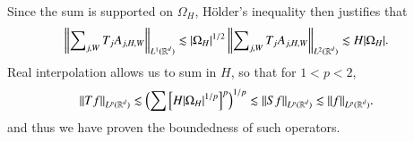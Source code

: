 %
%
%
Since the sum is supported on $\Omega_H$, H\"{o}lder's inequality then justifies that
%
\begin{equation}
\begin{split}
  \left\| \sum\nolimits_{j,W} T_j A_{j,H,W} \right\|_{L^1(\operatorname{\mathbb{R}}^d)} &\lesssim |\Omega_H|^{1/2} \left\| \sum\nolimits_{j,W} T_j A_{j,H,W} \right\|_{L^2(\operatorname{\mathbb{R}}^d)} \lesssim H |\Omega_H|.
\end{split}
\end{equation}
%
Real interpolation allows us to sum in $H$, so that for $1 < p < 2$,
%
\begin{equation}
\begin{split}
  \| Tf \|_{L^p(\operatorname{\mathbb{R}}^d)} &\lesssim \left( \sum \left[ H |\Omega_H|^{1/p} \right]^p \right)^{1/p} \lesssim \| S f \|_{L^p(\operatorname{\mathbb{R}}^d)} \lesssim \| f \|_{L^p(\operatorname{\mathbb{R}}^d)}.
\end{split}
\end{equation}
%
and thus we have proven the boundedness of such operators.

